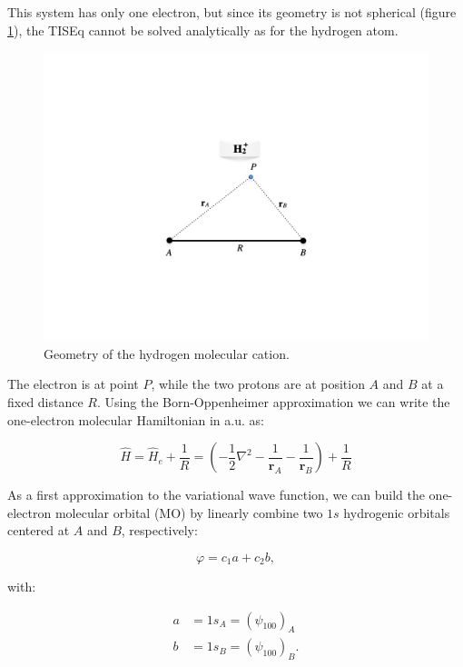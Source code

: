 \documentclass[
  9pt,
]{extbook}
\theoremstyle{definition}
\theoremstyle{definition}
\theoremstyle{definition}
\theoremstyle{remark}
\begin{document}
This system has only one electron, but since its geometry is not spherical (figure \ref{fig:Fig1c12}), the TISEq cannot be solved analytically as for the hydrogen atom.

\begin{figure}

{\centering \includegraphics[width=0.7\linewidth]{./img/OEP_figure1} 

}

\caption{Geometry of the hydrogen molecular cation.}\label{fig:Fig1c12}
\end{figure}

The electron is at point \(P\), while the two protons are at position \(A\) and \(B\) at a fixed distance \(R\). Using the Born-Oppenheimer approximation we can write the one-electron molecular Hamiltonian in a.u. as:

\begin{equation}
\hat{H} = \hat{H}_e+\frac{1}{R} = \left( -\frac{1}{2}\nabla^2-\frac{1}{\mathbf{r}_A}-\frac{1}{\mathbf{r}_B} \right)+\frac{1}{R}
\label{eq:bond1}
\end{equation}

As a first approximation to the variational wave function, we can build the one-electron molecular orbital (MO) by linearly combine two \(1s\) hydrogenic orbitals centered at \(A\) and \(B\), respectively:

\begin{equation}
\varphi = c_1 a + c_2 b,
\label{eq:bond2}
\end{equation}

with:

\begin{equation}
\begin{aligned}
a &= 1s_A = \left( \psi_{100} \right)_A\\
b &= 1s_B = \left( \psi_{100} \right)_B.
\end{aligned}
\label{eq:bond3}
\end{equation}
\end{document}
